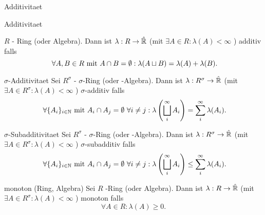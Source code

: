 \documentclass[class=article, crop=false]{standalone}
\begin{document}
\begin{zettel}{Additivitaet}

\begin{flashcard}[jlfedjrp]{Additivitaet}
	\begin{definition}
		$R$ - Ring (oder Algebra). Dann ist $\lambda : R \to  \hat{\mathbb{R} }$ (mit $\exists A \in R : \lambda(A) < \infty$ ) additiv falls
		\[
			\forall A,B \in R \tx{mit} A \cap  B = \emptyset  : \lambda(A \sqcup B) = \lambda(A) + \lambda(B)
		.\]
	\end{definition}
\end{flashcard}

\begin{flashcard}[dywlxykg]{$\sigma$-Additivitaet}
	Sei $R^{\sigma}$ - $\sigma$-Ring (oder -Algebra). Dann ist $\lambda : R^\sigma \to  \hat{\mathbb{R} }$ (mit $\exists A \in R^\sigma : \lambda(A) < \infty$ ) $\sigma$-additiv falls
	\[
		\forall \set{A_i}_{i \in \N } \tx{mit} A_i \cap  A_j = \emptyset  \forall i \neq  j : \lambda \left( \bigsqcup_i^{\infty}A_i \right) = \sum_{i}^{\infty} \lambda(A_i)
	.\]
\end{flashcard}

\begin{flashcard}[dywlxykg]{$\sigma$-Subadditivitaet}
	Sei $R^{\sigma}$ - $\sigma$-Ring (oder -Algebra). Dann ist $\lambda : R^\sigma \to  \hat{\mathbb{R} }$ (mit $\exists A \in R^\sigma : \lambda(A) < \infty$ ) $\sigma$-subadditiv falls
	\[
		\forall \set{A_i}_{i \in \N } \tx{mit} A_i \cap  A_j = \emptyset  \forall i \neq  j : \lambda \left( \bigsqcup_i^{\infty}A_i \right) \leq \sum_{i}^{\infty} \lambda(A_i)
	.\]
\end{flashcard}

\begin{flashcard}[dywlxykg]{monoton (Ring, Algebra)}
	Sei $R$ -Ring (oder Algebra). Dann ist $\lambda : R \to  \hat{\mathbb{R} }$ (mit $\exists A \in R^\sigma : \lambda(A) < \infty$ ) monoton falls
	\[
		\forall A \in R : \lambda(A) \geq 0
	.\]
\end{flashcard}

\end{zettel}
\end{document}
